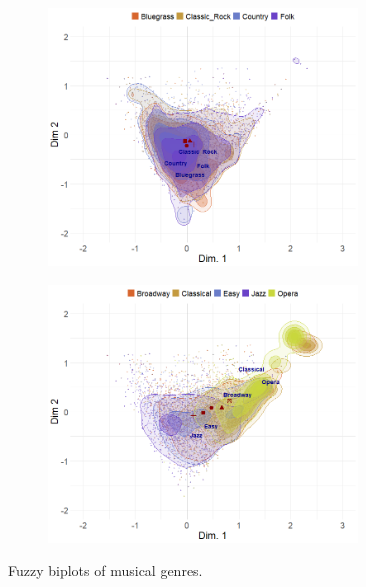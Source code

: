 \documentclass[12pt]{article}
\begin{document}
\begin{figure}[t]
\begin{subfigure}[b]{0.49\textwidth}
        \includegraphics[trim={0cm 0cm 0cm 0cm},clip, width=0.9\textwidth]{Plots/genre-proto-ex5.png}
            \caption{}
            \label{fig:genre-fuzz-e}
    \end{subfigure}
     \begin{subfigure}[b]{0.49\textwidth}
        \includegraphics[trim={0cm 0cm 0cm 0cm},clip, width=0.9\textwidth]{Plots/genre-proto-ex7.png}
            \caption{}
            \label{fig:genre-fuzz-f}
    \end{subfigure}
    \caption{Fuzzy biplots of musical genres.}
    \label{fig:genre-fuzz}
\end{figure}
\end{document}
